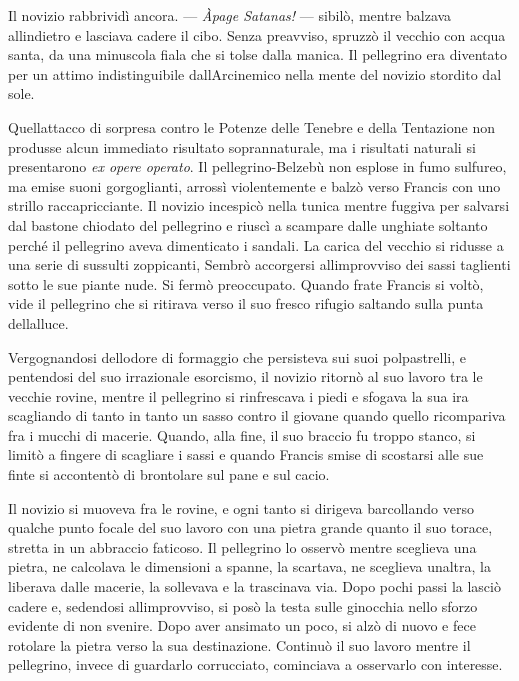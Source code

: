 Il novizio rabbrividì ancora. --- \emph{Àpage Satanas!} --- sibilò,
mentre balzava all\textquotesingle indietro e lasciava cadere il cibo.
Senza preavviso, spruzzò il vecchio con acqua santa, da una minuscola
fiala che si tolse dalla manica. Il pellegrino era diventato per un
attimo indistinguibile dall\textquotesingle Arcinemico nella mente del
novizio stordito dal sole.

Quell\textquotesingle attacco di sorpresa contro le Potenze delle
Tenebre e della Tentazione non produsse alcun immediato risultato
soprannaturale, ma i risultati naturali si presentarono \emph{ex opere
	operato}. Il pellegrino-Belzebù non esplose in fumo sulfureo, ma emise
suoni gorgoglianti, arrossì violentemente e balzò verso Francis con uno
strillo raccapricciante. Il novizio incespicò nella tunica mentre
fuggiva per salvarsi dal bastone chiodato del pellegrino e riuscì a
scampare dalle unghiate soltanto perché il pellegrino aveva dimenticato
i sandali. La carica del vecchio si ridusse a una serie di sussulti
zoppicanti, Sembrò accorgersi all\textquotesingle improvviso dei sassi
taglienti sotto le sue piante nude. Si fermò preoccupato. Quando frate
Francis si voltò, vide il pellegrino che si ritirava verso il suo fresco
rifugio saltando sulla punta dell\textquotesingle alluce.

Vergognandosi dell\textquotesingle odore di formaggio che persisteva sui
suoi polpastrelli, e pentendosi del suo irrazionale esorcismo, il
novizio ritornò al suo lavoro tra le vecchie rovine, mentre il
pellegrino si rinfrescava i piedi e sfogava la sua ira scagliando di
tanto in tanto un sasso contro il giovane quando quello ricompariva fra
i mucchi di macerie. Quando, alla fine, il suo braccio fu troppo stanco,
si limitò a fingere di scagliare i sassi e quando Francis smise di
scostarsi alle sue finte si accontentò di brontolare sul pane e sul
cacio.

Il novizio si muoveva fra le rovine, e ogni tanto si dirigeva
barcollando verso qualche punto focale del suo lavoro con una pietra
grande quanto il suo torace, stretta in un abbraccio faticoso. Il
pellegrino lo osservò mentre sceglieva una pietra, ne calcolava le
dimensioni a spanne, la scartava, ne sceglieva un\textquotesingle altra,
la liberava dalle macerie, la sollevava e la trascinava via. Dopo pochi
passi la lasciò cadere e, sedendosi all\textquotesingle improvviso, si
posò la testa sulle ginocchia nello sforzo evidente di non svenire. Dopo
aver ansimato un poco, si alzò di nuovo e fece rotolare la pietra verso
la sua destinazione. Continuò il suo lavoro mentre il pellegrino, invece
di guardarlo corrucciato, cominciava a osservarlo con interesse.

